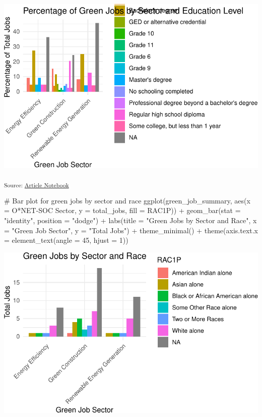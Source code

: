 \documentclass[
  letterpaper,
  DIV=11,
  numbers=noendperiod]{scrartcl}
\newenvironment{Shaded}{\begin{snugshade}}{\end{snugshade}}
\newcommand{\AttributeTok}[1]{\textcolor[rgb]{0.40,0.45,0.13}{#1}}
\newcommand{\CommentTok}[1]{\textcolor[rgb]{0.37,0.37,0.37}{#1}}
\newcommand{\DecValTok}[1]{\textcolor[rgb]{0.68,0.00,0.00}{#1}}
\newcommand{\FunctionTok}[1]{\textcolor[rgb]{0.28,0.35,0.67}{#1}}
\newcommand{\NormalTok}[1]{\textcolor[rgb]{0.00,0.23,0.31}{#1}}
\newcommand{\SpecialCharTok}[1]{\textcolor[rgb]{0.37,0.37,0.37}{#1}}
\newcommand{\StringTok}[1]{\textcolor[rgb]{0.13,0.47,0.30}{#1}}
\begin{document}
\includegraphics{index_files/figure-pdf/unnamed-chunk-45-2.pdf}

\textsubscript{Source:
\href{https://beeckcenter.github.io/climate-equity-workforce/index-preview.html}{Article
Notebook}}

\begin{Shaded}
\begin{Highlighting}[]
\CommentTok{\# Bar plot for green jobs by sector and race}
\FunctionTok{ggplot}\NormalTok{(green\_job\_summary, }\FunctionTok{aes}\NormalTok{(}\AttributeTok{x =} \StringTok{\textasciigrave{}}\AttributeTok{O*NET{-}SOC Sector}\StringTok{\textasciigrave{}}\NormalTok{, }\AttributeTok{y =}\NormalTok{ total\_jobs, }\AttributeTok{fill =}\NormalTok{ RAC1P)) }\SpecialCharTok{+}
  \FunctionTok{geom\_bar}\NormalTok{(}\AttributeTok{stat =} \StringTok{"identity"}\NormalTok{, }\AttributeTok{position =} \StringTok{"dodge"}\NormalTok{) }\SpecialCharTok{+}
  \FunctionTok{labs}\NormalTok{(}\AttributeTok{title =} \StringTok{"Green Jobs by Sector and Race"}\NormalTok{,}
       \AttributeTok{x =} \StringTok{"Green Job Sector"}\NormalTok{, }\AttributeTok{y =} \StringTok{"Total Jobs"}\NormalTok{) }\SpecialCharTok{+}
  \FunctionTok{theme\_minimal}\NormalTok{() }\SpecialCharTok{+}
  \FunctionTok{theme}\NormalTok{(}\AttributeTok{axis.text.x =} \FunctionTok{element\_text}\NormalTok{(}\AttributeTok{angle =} \DecValTok{45}\NormalTok{, }\AttributeTok{hjust =} \DecValTok{1}\NormalTok{))}
\end{Highlighting}
\end{Shaded}

\includegraphics{index_files/figure-pdf/unnamed-chunk-46-1.pdf}
\end{document}
